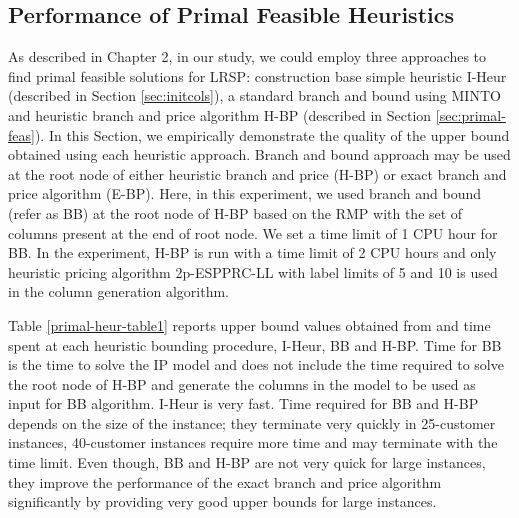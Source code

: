 \subsection{Performance of Primal Feasible Heuristics}
\label{comp:prifeasHeur}
As described in Chapter 2, in our study, we could employ three approaches
to find primal feasible solutions for LRSP: construction base simple heuristic
I-Heur (described in Section \ref{sec:initcols}), a standard branch and bound using
MINTO and heuristic branch and price algorithm H-BP (described in Section
\ref{sec:primal-feas}). In this Section, we empirically demonstrate the quality of
the upper bound obtained using each heuristic approach.
Branch and bound approach may be used at the root node
of either heuristic branch and price (H-BP) or exact branch and price algorithm (E-BP).
Here, in this experiment, we used branch and bound (refer as BB) at the root node
of H-BP based on the RMP with the set of columns present at the end of root node.
We set a time limit of 1 CPU hour for BB. In the experiment, H-BP is run with a time
limit of 2 CPU hours and only heuristic pricing algorithm 2p-ESPPRC-LL with label
limits of 5 and 10  is used in the column generation algorithm.

Table \ref{primal-heur-table1} reports upper bound values obtained from and time spent
at each heuristic bounding procedure, I-Heur, BB and H-BP. Time for BB is the time to
solve the IP model and does not include the time required to solve the root node of H-BP
and generate the columns in the model to be used as input for BB algorithm.
I-Heur is very fast. Time required for BB and H-BP depends on the size of the instance;
they terminate very quickly in 25-customer instances, 40-customer instances require more time
and may terminate with the time limit. Even though, BB and H-BP are not very quick for
large instances, they improve the performance of the exact  branch and price algorithm
significantly by providing very good upper bounds for large instances.

